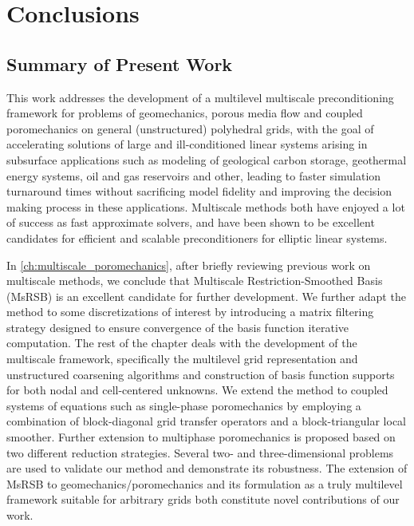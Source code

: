 \chapter{Conclusions}
\label{ch:conclusions}

\section{Summary of Present Work}

This work addresses the development of a multilevel multiscale preconditioning framework for problems of geomechanics, porous media flow and coupled poromechanics on general (unstructured) polyhedral grids, with the goal of accelerating solutions of large and ill-conditioned linear systems arising in subsurface applications such as modeling of geological carbon storage, geothermal energy systems, oil and gas reservoirs and other, leading to faster simulation turnaround times without sacrificing model fidelity and improving the decision making process in these applications.   Multiscale methods both have enjoyed a lot of success as fast approximate solvers, and have been shown to be excellent candidates for efficient and scalable preconditioners for elliptic linear systems.

In \cref{ch:multiscale_poromechanics}, after briefly reviewing previous work on multiscale methods, we conclude that Multiscale Restriction-Smoothed Basis (MsRSB) is an excellent candidate for further development.   We further adapt the method to some discretizations of interest by introducing a matrix filtering strategy designed to ensure convergence of the basis function iterative computation.   The rest of the chapter deals with the development of the multiscale framework, specifically the multilevel grid representation and unstructured coarsening algorithms and construction of basis function supports for both nodal and cell-centered unknowns.   We extend the method to coupled systems of equations such as single-phase poromechanics by employing a combination of block-diagonal grid transfer operators and a block-triangular local smoother.   Further extension to multiphase poromechanics is proposed based on two different reduction strategies.   Several two- and three-dimensional problems are used to validate our method and demonstrate its robustness.   The extension of MsRSB to geomechanics/poromechanics and its formulation as a truly multilevel framework suitable for arbitrary grids both constitute novel contributions of our work.

